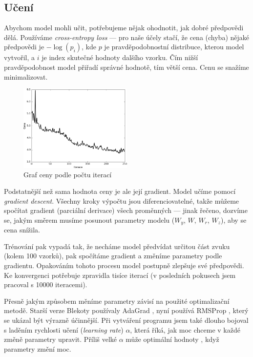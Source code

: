 \documentclass[a4]{article}
\begin{document}
\subsection{Učení}
Abychom model mohli učit, potřebujeme nějak ohodnotit, jak dobré předpovědi dělá. Používáme \textit{cross-entropy loss} --- pro naše účely stačí, že cena (chyba) nějaké předpovědi je $-\log(p_{i})$, kde $p$ je pravděpodobnostní distribuce, kterou model vytvořil, a $i$ je index skutečné hodnoty dalšího vzorku. Čím nižší pravděpodobnost model přiřadí správné hodnotě, tím větší cena. Cenu se snažíme minimalizovat.

\begin{figure}
    \centering
    \includegraphics[width=0.5\textwidth]{loss_4}
    \caption{Graf ceny podle počtu iterací}
\end{figure}

Podstatnější než sama hodnota ceny je ale její gradient. Model učíme pomocí \textit{gradient descent}. Všechny kroky výpočtu jsou diferenciovatelné, takže můžeme spočítat gradient (parciální derivace) všech proměnných --- jinak řečeno, dozvíme se, jakým směrem musíme posunout parametry modelu ($W_y$, $W$, $W_r$, $W_z$), aby se cena snížila.

Trénování pak vypadá tak, že necháme model předvídat určitou část zvuku (kolem 100 vzorků), pak spočítáme gradient a změníme parametry podle gradientu. Opakováním tohoto procesu model postupně zlepšuje své předpovědi. Ke konvergenci potřebuje zpravidla tisíce iterací (v posledních pokusech jsem pracoval s 10000 iteracemi).

Přesně jakým způsobem měníme parametry závisí na použité optimalizační metodě. Starší verze Blekoty používaly AdaGrad \cite{adagrad}, nyní používá RMSProp \cite{rmsprop}, který se ukázal být výrazně účinnější. Při vytváření programu jsem také dlouho bojoval s laděním rychlosti učení (\textit{learning rate}) $\alpha$, která říká, jak moc chceme v každé změně parametry upravit. Příliš velké $\alpha$ může optimální hodnoty , když parametry změní moc.
\end{document}
